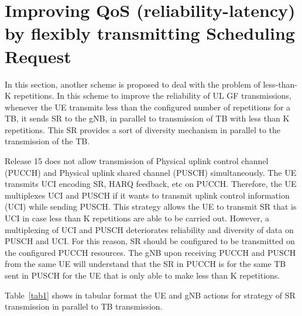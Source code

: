 \documentclass[conference]{IEEEtran}
\begin{document}
\section{Improving QoS (reliability-latency) by flexibly transmitting Scheduling Request }\label{III}

In this section, another scheme is proposed to deal with the problem of less-than-K repetitions. In this scheme to improve the reliability of UL GF transmissions, whenever the UE transmits less than the configured number of repetitions for a TB, it sends SR to the gNB, in parallel to transmission of TB with less than K repetitions.  This SR provides a sort of diversity mechanism in parallel to the transmission of the TB.

Release 15 does not allow transmission of Physical uplink control channel (PUCCH) and Physical uplink shared channel (PUSCH) simultaneously. The UE transmits UCI encoding SR, HARQ feedback, etc on PUCCH. Therefore, the UE multiplexes UCI and PUSCH if it wants to transmit uplink control information (UCI) while sending PUSCH. This strategy allows the UE to transmit SR that is UCI in case less than K repetitions are able to be carried out. However, a multiplexing of UCI and PUSCH deteriorates reliability and diversity of data on PUSCH and UCI. For this reason, SR should be configured to be transmitted on the configured PUCCH resources. The gNB upon receiving PUCCH and PUSCH from the same UE will understand that the SR in PUCCH is for the same TB sent in PUSCH for the UE that is only able to make less than K repetitions.

Table~\ref{tab1} shows in tabular format the UE and gNB actions for strategy of SR transmission in parallel to TB transmission. 
\end{document}
